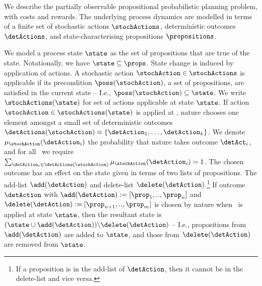 

We describe the partially observable propositional probabilistic
planning problem, with costs and rewards. The underlying process
dynamics are modelled in terms of a finite set of stochastic actions
$\stochActions$, deterministic outcomes $\detActions$, and
state-characterising propositions $\propositions$.

We model a process state $\state$ as the set of propositions that are
true of the state. Notationally, we have $\state \subseteq
\props$. State change is induced by application of actions. A
stochastic action $\stochAction \in \stochActions$ is applicable if
its precondition $\poss(\stochAction)$, a set of propositions, are
satisfied in the current state -- I.e., $\poss(\stochAction) \subseteq
\state$. We write $\stochActions(\state)$ for set of actions
applicable at state $\state$.  If action $\stochAction \in
\stochActions(\state)$ is applied at \state, nature chooses one
element amongst a small set of deterministic outcomes
$\detActions(\stochAction) \equiv \{\detAction_1, \ldots, \detAction_k
\}$. We denote $\mu_{\stochAction}(\detAction_i)$ the probability that
nature takes outcome $\detAct_i$, and for all \stochAction\ we require
$\sum_{\detAction_i \in \detActions(\stochAction)}
\mu_{\stochAction}(\detAction_i) = 1$. The chosen outcome has an
effect on the state given in terms of two lists of propositions. The
add-list $\add(\detAction)$ and delete-list
$\delete(\detAction)$.\footnote{If a proposition is in the add-list of
$\detAction$, then it cannot be in the delete-list and vice versa.}
If outcome $\detAction$ with $\add(\detAction) := [\prop_1,
..,\prop_n]$ and $\delete(\detAction) := [\prop_{n+1},
..,\prop_m]$ is chosen by nature when \stochAction\ is
applied at state $\state$, then the resultant state is $ ( \state \cup
\add(\detAction) ) \backslash \delete(\detAction)$ -- I.e.,
propositions from $\add(\detAction)$ are added to $\state$, and those
from $\delete(\detAction)$ are removed from $\state$.

